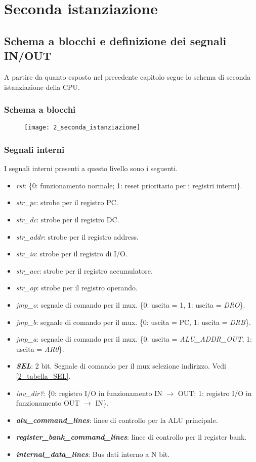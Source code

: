 \chapter{Seconda istanziazione}
\section{Schema a blocchi e definizione dei segnali IN/OUT}
A partire da quanto esposto nel precedente capitolo segue lo schema di seconda istanziazione della CPU.
\subsection{Schema a blocchi}
\label{seconda_ist}
\begin{figure}[H]
	\centering
	\texttt{[image: 2\_seconda\_istanziazione]}
	\label{fig:seconda_istanziazione}
\end{figure}

\newpage
\subsection{Segnali interni}
I segnali interni presenti a questo livello sono i seguenti.
\begin{itemize}
	\item \textit{rst}: \{0: funzionamento normale; 1: reset prioritario per i registri interni\}.
	\item \textit{str\_pc}: strobe per il registro PC.
	\item \textit{str\_dc}: strobe per il registro DC.
	\item \textit{str\_addr}: strobe per il registro address.
	\item \textit{str\_io}: strobe per il registro di I/O.
	\item \textit{str\_acc}: strobe per il registro accumulatore.
	\item \textit{str\_op}: strobe per il registro operando.
	\item \textit{jmp\_o}: segnale di comando per il mux. \{0: uscita = 1, 1: uscita = \textit{DRO}\}.
	\item \textit{jmp\_b}: segnale di comando per il mux. \{0: uscita = PC, 1: uscita = \textit{DRB}\}.
	\item \textit{jmp\_a}: segnale di comando per il mux. \{0: uscita = \textit{ALU\_ADDR\_OUT}, 1: uscita = \textit{AR0}\}.
	\item \textit{\textbf{SEL}}: 2 bit. Segnale di comando per il mux selezione indirizzo. Vedi \ref{2_tabella_SEL}.
	\item \textit{inv\_dir?}: \{0: registro I/O in funzionamento IN $\rightarrow$ OUT; 1: registro I/O in funzionamento OUT $\rightarrow$ IN\}.
	\item \textit{\textbf{alu\_command\_lines}}: linee di controllo per la ALU principale.
	\item \textit{\textbf{register\_bank\_command\_lines}}: linee di controllo per il register bank.
	\item \textit{\textbf{internal\_data\_lines}}: Bus dati interno a N bit.
\end{itemize}

